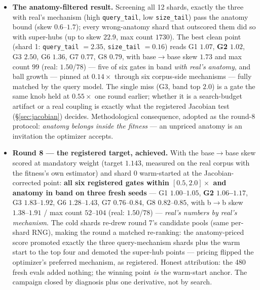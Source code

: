 \documentclass[11pt]{article}
\begin{document}
\begin{itemize}
  anatomy check caught a scalar-gaming optimizer in the wild --- the
  non-identifiability thesis demonstrated \emph{by the search itself}.
\item \textbf{The anatomy-filtered result.} Screening all 12 shards, exactly
  the three with real's mechanism (high \texttt{query\_tail}, low
  \texttt{size\_tail}) pass the anatomy bound (skew $0.6$--$1.7$); every
  wrong-anatomy shard that outscored them did so with super-hubs (up to skew
  $22.9$, max count $1730$). The best clean point (shard 1:
  \texttt{query\_tail} $=2.35$, \texttt{size\_tail} $=0.16$) reads
  G1 $1.07$, \textbf{G2 $1.02$}, G3 $2.50$, G6 $1.36$, G7 $0.77$, G8 $0.79$,
  with base$\to$base skew $1.73$ and max count $99$ (real: $1.50$/$78$) ---
  five of six gates in band \emph{with real's anatomy}, and ball growth ---
  pinned at $0.14\times$ through six corpus-side mechanisms --- fully matched
  by the query model. The single miss (G3, band top $2.0$) is a gate the same
  knob held at $0.55\times$ one round earlier; whether it is a search-budget
  artifact or a real coupling is exactly what the registered Jacobian test
  (\S\ref{sec:jacobian}) decides. Methodological consequence, adopted as the
  round-8 protocol: \emph{anatomy belongs inside the fitness} --- an unpriced
  anatomy is an invitation the optimizer accepts.
\item \textbf{Round 8 --- the registered target, achieved.} With the
  base$\to$base skew scored at mandatory weight (target $1.143$, measured on
  the real corpus with the fitness's own estimator) and shard 0 warm-started
  at the Jacobian-corrected point: \textbf{all six registered gates within
  $[0.5,2.0]\times$ and anatomy in band on three fresh seeds} --- G1
  $1.00$--$1.05$, \textbf{G2 $1.06$--$1.17$}, G3 $1.83$--$1.92$, G6
  $1.28$--$1.43$, G7 $0.76$--$0.84$, G8 $0.82$--$0.85$, with b$\to$b skew
  $1.38$--$1.91$ / max count $52$--$104$ (real: $1.50$/$78$) ---
  \emph{real's numbers by real's mechanism}. The cold shards re-drew round
  7's candidate pools (same per-shard RNG), making the round a matched
  re-ranking: the anatomy-priced score promoted exactly the three
  query-mechanism shards plus the warm start to the top four and demoted the
  super-hub points --- pricing flipped the optimizer's preferred mechanism, as
  registered. Honest attribution: the 480 fresh evals added nothing; the
  winning point \emph{is} the warm-start anchor. The campaign closed by
  diagnosis plus one derivative, not by search.
\end{itemize}
\end{document}
